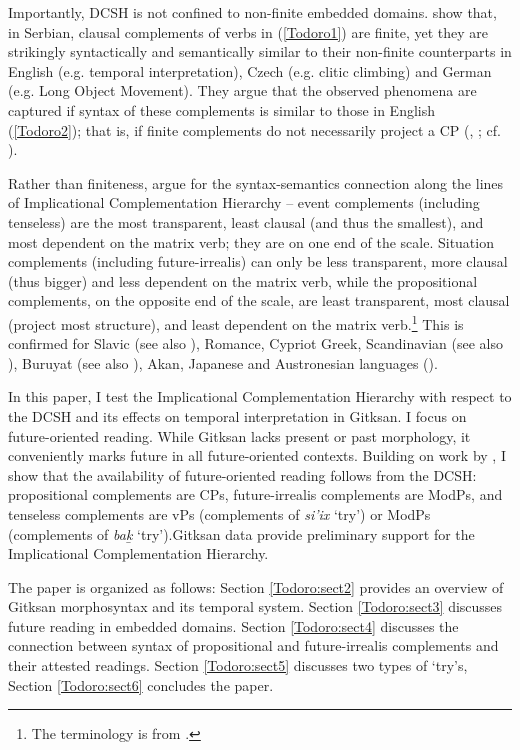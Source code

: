 \documentclass[output=paper]{langscibook}
\begin{document}
Importantly, DCSH is not confined to non-finite embedded domains. \citet{todoroviwurmbrand2020b} show that, in Serbian, clausal complements of verbs in (\ref{Todoro1}) are finite, yet they are strikingly syntactically and semantically similar to their non-finite counterparts in English (e.g. temporal interpretation), Czech (e.g. clitic climbing) and German (e.g. Long Object Movement). They argue that the observed phenomena are captured if syntax of these complements is similar to those in English (\ref{Todoro2}); that is, if finite complements do not necessarily project a CP (\citealt{adger2007a}, \citealt{kornfilt2007a}; cf.  \citealt{rizzi1997a}).

Rather than finiteness, \citealt{wurmbrand2019a} argue for the syntax-semantics connection along the lines of Implicational Complementation Hierarchy – event complements (including tenseless) are the most transparent, least clausal (and thus the smallest), and most dependent on the matrix verb; they are on one end of the scale.  Situation complements (including future-irrealis) can only be less transparent, more clausal (thus bigger) and less dependent on the matrix verb, while the propositional complements, on the opposite end of the scale, are least transparent, most clausal (project most structure), and least dependent on the matrix verb.\footnote{The terminology is from \citet{ramchandsvenonius2014a}.} This is confirmed for Slavic (see also \citealt{wurmbrandetal2020}), Romance, Cypriot Greek, Scandinavian (see also \citealt{wurmbradnchristos2020}), Buruyat (see also \citealt{bondarenko2018a}), Akan, Japanese and Austronesian languages (\citealt{wurmbrand2017a}). 

In this paper, I test the Implicational Complementation Hierarchy with respect to the DCSH and its effects on temporal interpretation in Gitksan. I focus on future-oriented reading. While Gitksan lacks present or past morphology, it conveniently marks future in all future-oriented contexts. Building on work by \citet{matthewson2018a}, I show that the availability of future-oriented reading follows from the DCSH: propositional complements are CPs, future-irrealis complements are ModPs, and tenseless complements are vPs (complements of \emph{si’ix} ‘try’) or ModPs (complements of \emph{bak̲} ‘try’).Gitksan data provide preliminary support for the Implicational Complementation Hierarchy.

The paper is organized as follows: Section \ref{Todoro:sect2} provides an overview of Gitksan morphosyntax and its temporal system. Section \ref{Todoro:sect3} discusses future reading in embedded domains. Section \ref{Todoro:sect4} discusses the connection between syntax of propositional and future-irrealis complements and their attested readings. Section \ref{Todoro:sect5} discusses two types of ‘try’s, Section \ref{Todoro:sect6} concludes the paper. 
\end{document}
